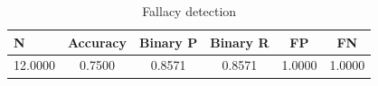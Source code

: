 \begin{table}[t]
\centering
\caption{Fallacy detection}
\label{tab:table5_fallacy_detection}
\begin{tabular}{lccccc}
\toprule
N & Accuracy & Binary P & Binary R & FP & FN \\
\midrule
12.0000 & 0.7500 & 0.8571 & 0.8571 & 1.0000 & 1.0000 \\
\bottomrule
\end{tabular}
\end{table}
